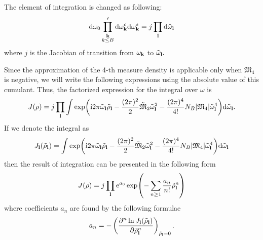 The element of integration is changed as following:
\begin{equation}
	{\rm d} \omega_0 \prod'_{\substack{\vb k \\ k\leq B}} {\rm d} \omega_{\vb k}^c {\rm d}\omega_{\vb k}^s = j \prod_{\vb l} {\rm d} \tilde{\omega}_{\vb l}
\end{equation}
where $j$ is the Jacobian of transition from $\omega_{\vb k}$ to $\tilde{\omega}_{\vb l}.$

Since the approximation of the 4-th measure density is applicable only when $\mathfrak{M_4}$ is negative, we will write the following expressions using the absolute value of this cumulant. 
Thus, the factorized expression for the integral over $\omega$ is
\begin{equation}
	J(\rho) = j\prod_{\vb l} 
	\int \exp({\rm i}2\pi \tilde{\omega}_{\vb l} \tilde{\rho}_{\vb l} - \frac{(2\pi)^2}{2} \tilde{\mathfrak{M}}_2 \tilde{\omega}_{\vb l}^2 - \frac{(2\pi)^4}{4!}N_B \abs{\mathfrak{M}_4} \tilde{\omega}_{\vb l}^4)
	{\rm d}\tilde{\omega}_{\vb l}.
\end{equation}
If we denote the integral as
\begin{equation}
	J_{\vb l}(\tilde{\rho}_{\vb l}) = \int \exp({\rm i}2\pi \tilde{\omega}_{\vb l} \tilde{\rho}_{\vb l} 
	- \frac{(2\pi)^2}{2} \tilde{\mathfrak{M}}_2 \tilde{\omega}_{\vb l}^2 - \frac{(2\pi)^4}{4!}N_B \abs{\mathfrak{M}_4} \tilde{\omega}_{\vb l}^4)
	{\rm d}\tilde{\omega}_{\vb l}
\end{equation}
then the result of integration can be presented in the following form
\begin{equation}
	J(\rho) = j\prod_{\vb l}{\rm e}^{a_0} \exp(-\sum_{n\geq 1} \frac{a_n}{n!}\tilde{\rho}_{\vb l}^n)
\end{equation}
where coefficients $a_n$ are found by the following formulae
\begin{equation}
	a_n = - \left(\frac{\partial^n \ln J_{\vb l}(\tilde{\rho}_{\vb l})}{\partial \tilde{\rho}_{\vb l}^n}\right)_{\tilde{\rho}_{\vb l}=0}.
\end{equation}

